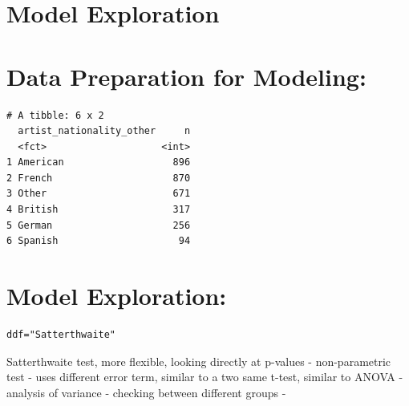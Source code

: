 \documentclass[
  letterpaper,
  DIV=11,
  numbers=noendperiod]{scrreprt}
\begin{document}
\hypertarget{model-exploration}{%
\chapter{Model Exploration}\label{model-exploration}}

\hypertarget{data-preparation-for-modeling}{%
\chapter{Data Preparation for
Modeling:}\label{data-preparation-for-modeling}}

\begin{verbatim}
# A tibble: 6 x 2
  artist_nationality_other     n
  <fct>                    <int>
1 American                   896
2 French                     870
3 Other                      671
4 British                    317
5 German                     256
6 Spanish                     94
\end{verbatim}

\hypertarget{model-exploration-1}{%
\chapter{Model Exploration:}\label{model-exploration-1}}

\begin{verbatim}
ddf="Satterthwaite"
\end{verbatim}

Satterthwaite test, more flexible, looking directly at p-values -
non-parametric test - uses different error term, similar to a two same
t-test, similar to ANOVA - analysis of variance - checking between
different groups -
\end{document}
